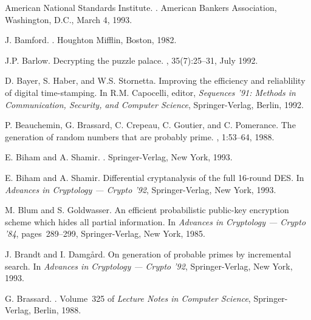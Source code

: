 %
%

\begin{thebibliography}{10}

{American National Standards Institute}.
.
\newblock American Bankers Association, Washington, D.C., March 4, 1993.

J. Bamford.
.
\newblock Houghton Mifflin, Boston, 1982.

J.P. Barlow.
\newblock Decrypting the puzzle palace.
, 35(7):25--31, July 1992.

D. Bayer, S. Haber, and W.S. Stornetta.
\newblock Improving the efficiency and reliablility of digital time-stamping.
\newblock In R.M. Capocelli, editor, {\it Sequences '91: Methods in
  Communication, Security, and Computer Science}, Springer-Verlag, Berlin,
  1992.

P. Beauchemin, G. Brassard, C. Crepeau, C. Goutier, and C. Pomerance.
\newblock The generation of random numbers that are probably prime.
, 1:53--64, 1988.

E. Biham and A. Shamir.
.
\newblock Springer-Verlag, New York, 1993.

E. Biham and A. Shamir.
\newblock Differential cryptanalysis of the full 16-round {DES}.
\newblock In {\it Advances in Cryptology --- Crypto '92}, Springer-Verlag, New
  York, 1993.

M. Blum and S. Goldwasser.
\newblock An efficient probabilistic public-key encryption scheme which hides
  all partial information.
\newblock In {\it Advances in Cryptology --- Crypto '84}, pages~289--299,
  Springer-Verlag, New York, 1985.

J. Brandt and I. Damg{\aa}rd.
\newblock On generation of probable primes by incremental search.
\newblock In {\it Advances in Cryptology --- Crypto '92}, Springer-Verlag, New
  York, 1993.

G. Brassard.
.
\newblock Volume~325 of {\it Lecture Notes in Computer Science},
  Springer-Verlag, Berlin, 1988.


\end{thebibliography}
